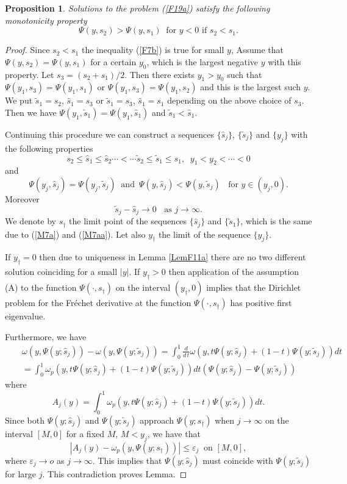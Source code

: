 \documentclass[a4paper,reqno,12pt]{amsart}
\theoremstyle{plain}
\newtheorem{proposition}[theorem]{Proposition}
\theoremstyle{definition}
\numberwithin{equation}{section}
\begin{document}
\begin{proposition}\label{PM1a} Solutions to the problem (\ref{F19a}) satisfy the following monotonicity property
\begin{equation}\label{F7b}
\Psi(y,s_2)>\Psi(y,s_1)\;\;\mbox{for $y<0$ if $s_2<s_1$}.
\end{equation}
\end{proposition}
\begin{proof} Since $s_2<s_1$ the inequality (\ref{F7b}) is true for small $y$,
Assume that $\Psi(y,s_2)=\Psi(y,s_1)$ for a certain $y_0$, which is the largest negative $y$ with this property. Let $s_3=(s_2+s_1)/2$. Then there exists $y_1>y_0$ such that $\Psi(y_1,s_3)=\Psi(y_1,s_1)$ or $\Psi(y_1,s_3)=\Psi(y_1,s_2)$ and this is the largest such $y$. We put $\tilde{s}_1=s_2$, $\hat{s}_1=s_3$ or $\tilde{s}_1=s_3$, $\hat{s}_1=s_1$ depending on the above choice of $s_3$. Then we have $\Psi(y_1,\tilde{s}_1)=\Psi(y_1,\hat{s}_1)$ and  $\tilde{s}_1<\hat{s}_1$.

Continuing this procedure we can construct a sequences $\{\hat{s}_j\}$, $\{\tilde{s}_j\}$ and $\{y_j\}$ with the following properties
\begin{equation}\label{M7a}
s_2\leq\hat{s}_1\leq\hat{s}_2\cdots <\cdots \tilde{s}_2\leq\tilde{s}_1\leq s_1,\;\; y_1<y_2<\cdots <0
\end{equation}
and
 $$
 \Psi(y_j,\hat{s}_j)=\Psi(y_j,\tilde{s}_j)\;\;
 \mbox{and}\:\;\Psi(y,\hat{s}_j)<\Psi(y,\tilde{s}_j)\;\;\mbox{ for $y\in (y_j,0)$}.
 $$
Moreover
\begin{equation}\label{M7aa}
\tilde{s}_j-\hat{s}_j\to 0\;\;\mbox{ as $j\to\infty$}.
\end{equation}
We denote by $s_\dag$ the limit point of the sequences $\{\hat{s}_j\}$ and $\{\tilde{s}_1\}$, which is the same due to (\ref{M7a}) and (\ref{M7aa}). Let also $y_\dag$ the limit of the sequence $\{y_j\}$.

If $y_\dag=0$ then due to uniqueness in Lemma \ref{LemF11a} there are no two different solution coinciding for a small $|y|$. If $y_\dag>0$ then application of the assumption
(A) to the function $\Psi(\cdot,s_\dag)$ on the interval $(y_\dag,0)$ implies that the Dirichlet problem  for the Fr\'{e}chet derivative at the function $\Psi(\cdot,s_\dag)$ has positive first eigenvalue.

Furthermore, we have
\begin{eqnarray*}
&&\omega(y,\Psi(y;\hat{s}_j))-\omega(y,\Psi(y;\tilde{s}_j))=
\int_0^1\frac{d}{d\,t}\omega(y,t\Psi(y;\hat{s}_j)+(1-t)\Psi(y;\tilde{s}_j))dt\\
&&=\int_0^1\omega_p(y,t\Psi(y;\hat{s}_j)+(1-t)\Psi(y;\tilde{s}_j))dt
(\Psi(y;\hat{s}_j)-\Psi(y;\tilde{s}_j))
\end{eqnarray*}
where
$$
A_j(y)=\int_0^1\omega_p(y,t\Psi(y;\hat{s}_j)+(1-t)\Psi(y;\tilde{s}_j))dt.
$$
Since both $\Psi(y;\hat{s}_j)$ and $\Psi(y;\tilde{s}_j)$ approach $\Psi(y;s_\dag)$ when $j\to\infty$ on the interval $[M,0]$ for a fixed $M$, $M<y_j$, we have that
$$
|A_j(y)-\omega_p(y,\Psi(y;s_\dag))|\leq \varepsilon_j\;\;\mbox{on $[M,0]$},
$$
where $\varepsilon_j\to o$ as $j\to\infty$. This implies that $\Psi(y;\hat{s}_j)$ must coincide with $\Psi(y;\tilde{s}_j)$ for large $j$. This contradiction proves Lemma.


\end{proof}
\end{document}
